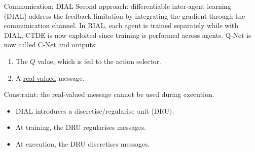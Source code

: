 \documentclass[9pt, hyperref={pdfusetitle,colorlinks=true,allcolors=DarkBlue}]{beamer}
\begin{document}
\begin{frame}{Communication: DIAL}
Second approach: differentiable inter-agent learning (DIAL) address the feedback limitation by integrating the gradient through the communication channel.
\vfill
In RIAL, each agent is trained separately while with DIAL, CTDE is now exploited since training is performed across agents.
\vfill
Q-Net is now called C-Net and outputs:
\begin{enumerate}
    \item The $Q$ value, which is fed to the action selector.
    \item A \underline{real-valued} message.
\end{enumerate}
\vfill
Constraint: the real-valued message cannot be used during execution.
\begin{itemize}
    \item DIAL introduces a discretise/regularise unit (DRU).
    \item At training, the DRU regularises messages.
    \item At execution, the DRU discretises messages.
\end{itemize}

    
\end{frame}
\end{document}
